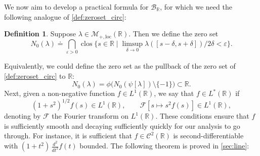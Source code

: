 \documentclass{cams-l} %
\newcommand{\dave}[1]{#1}\newcommand{\davebegin}{}\newcommand{\daveend}{}\newcommand{\george}[1]{#1}
\newcommand{\RR}{\mathbb R}
\newcommand{\cM}{\mathcal M}
\newcommand{\cB}{\mathcal B}
\newcommand{\cC}{\mathcal C}
\newcommand{\cF}{\mathcal F}
\newcommand{\eps}{\varepsilon}
\newcommand{\op}{\operatorname}
\theoremstyle{definition}
\newtheorem{definition}[theorem]{Definition}
\theoremstyle{remark}
\numberwithin{equation}{section}
\begin{document}
\dave{We now aim to develop} a practical formula for $\cB_\RR$, for which we need the following analogue of \cref{def:zeroset_circ}:
\begin{definition}\label{def:zeroset}
    Suppose $\lambda\in\cM_{+,\mathrm{loc}}(\RR)$. Then we define the zero set
    \[N_{0}(\lambda) \doteq \bigcap_{\eps>0}\op{clos}\Big\{s\in\RR\;\Big|\;\limsup_{\delta\to 0}\lambda([s-\delta,s+\delta])/2\delta < \eps\Big\}.\]
\end{definition}
Equivalently, we could define the zero set as the pullback of the zero set of \cref{def:zeroset_circ} to $\RR$:
    \[N_0(\lambda)= \phi\big(N_0(\psi[\lambda])\setminus\{-1\}\big)\subset\RR.\]
Next, given a non-negative function $f\in L^1(\RR)$, we say that $f\in L^*(\RR)$ if
\[(1+s^2)^{1/2}f(s)\in L^1(\RR),\qquad \cF\left[s\mapsto s^2f(s)\right]\in L^1(\RR),\]
denoting by $\cF$ the Fourier transform on $L^1(\RR)$. These conditions ensure that $f$ is sufficiently smooth and decaying sufficiently quickly for our analysis to go through. For instance, it is sufficient that $f\in\cC^2(\RR)$ is second-differentiable with $(1+t^2)\,\frac{d^2}{dt^2}f(t)$ bounded. The following theorem is proved in \cref{sec:line}:
\end{document}
